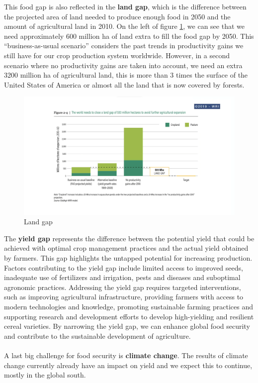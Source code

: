 \documentclass[../summary.tex]{subfiles}
\begin{document}
	This food gap is also reflected in the \textbf{land gap}, which is the difference between the projected area of land needed to produce enough food in 2050 and the amount of agricultural land in 2010. On the left of figure \ref{fig:land_gap}, we can see that we need approximately 600 million ha of land extra to fill the food gap by 2050. This “business-as-usual scenario” considers the past trends in productivity gains we still have for our crop production system worldwide. However, in a second scenario where no productivity gains are taken into account, we need an extra 3200 million ha of agricultural land, this is more than 3 times the surface of the United States of America or almost all the land that is now covered by forests.
	\\
	\begin{figure}[htbp]
		\centering
		\includegraphics[width=1\linewidth]{images/6-land-gap.png}
		\caption{Land gap}
		\label{fig:land_gap}
	\end{figure}
	
	The \textbf{yield gap} represents the difference between the potential yield that could be achieved with optimal crop management practices and the actual yield obtained by farmers. This gap highlights the untapped potential for increasing production. Factors contributing to the yield gap include limited access to improved seeds, inadequate use of fertilizers and irrigation, pests and diseases and suboptimal agronomic practices. Addressing the yield gap requires targeted interventions, such as improving agricultural infrastructure, providing farmers with access to modern technologies and knowledge, promoting sustainable farming practices and supporting research and development efforts to develop high-yielding and resilient cereal varieties. By narrowing the yield gap, we can enhance global food security and contribute to the sustainable development of agriculture.
	\\\\
	A last big challenge for food security is \textbf{climate change}. The results of climate change currently already have an impact on yield and we expect this to continue, mostly in the global south.
	\newpage
	
\end{document}
